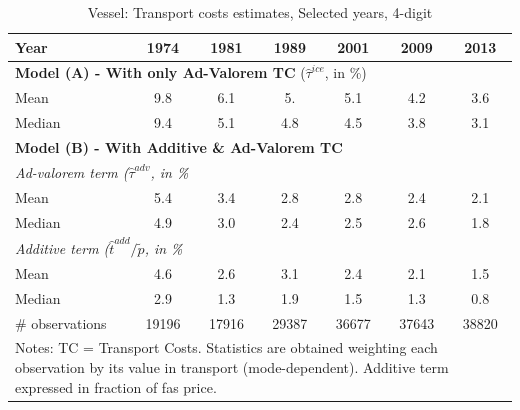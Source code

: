 \documentclass[a4paper,11pt]{article}
\begin{document}
\begin{table}[htbp]
  \centering
\caption{Vessel: Transport costs estimates, Selected years, 4-digit}
\begin{center}
    \begin{tabular}{l|cccccc}
   \hline\hline
Year & 1974  & 1981  & 1989  & 2001  & 2009  & 2013 \\
\hline
\multicolumn{7}{l}{\textbf{Model (A) - With only Ad-Valorem TC} ($\widehat{\tau}^{ice}$, in \%)} \\
Mean  & 9.8 & 6.1 & 5. & 5.1 & 4.2 & 3.6  \\
Median & 9.4 & 5.1 & 4.8 & 4.5 & 3.8 & 3.1 \\
\hline
\multicolumn{7}{l}{\textbf{Model (B) - With Additive \& Ad-Valorem TC} }\\ \hline
\multicolumn{7}{l}{\textit{Ad-valorem term ($\widehat{\tau}^{adv}$, in \%} }   \\ \hline
Mean  & 5.4 & 3.4 & 2.8 & 2.8 & 2.4 & 2.1  \\
Median & 4.9 & 3.0 & 2.4 & 2.5 & 2.6 & 1.8 \\
\hline
\multicolumn{7}{l}{\textit{Additive term ($\widehat{t}^{add}/\widetilde{p}$, in \%} }   \\ \hline
Mean  & 4.6 & 2.6 & 3.1 & 2.4 & 2.1 & 1.5  \\
Median & 2.9 & 1.3 & 1.9 & 1.5 & 1.3 & 0.8 \\
\hline
\# observations & 19196 & 17916 & \multicolumn{1}{c}{29387} & \multicolumn{1}{c}{36677} & \multicolumn{1}{c}{37643} & \multicolumn{1}{c}{38820} \\
\hline\hline
\multicolumn{7}{l}{\parbox[l]{11cm}{ \vspace{7pt}\scriptsize{Notes: TC = Transport Costs. Statistics are obtained weighting each observation by its value in transport (mode-dependent). Additive term expressed in fraction of fas price.}}}
\end{tabular}%
\end{center}
\label{tab:result_ves_rob}%
\end{table}%
\end{document}
